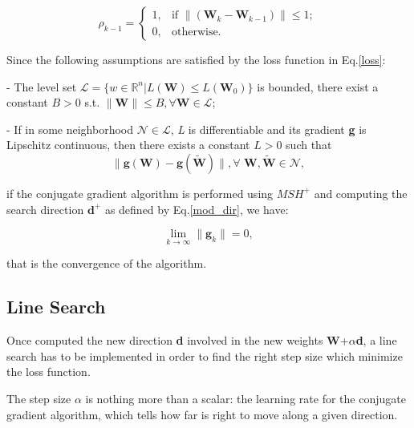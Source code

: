			\begin{equation}
			\label{rho}
			  \rho_{k-1} =\begin{cases}
			    1 , & \text{if }\|(\textbf{W}_k - \textbf{W}_{k-1})\| \leq 1;\\
			    0 , & \text{otherwise.}
			  \end{cases}
			\end{equation}

			Since the following assumptions are satisfied by the loss function in Eq.\ref{loss}:

			\begin{asu} - \label{as:1}
  				The level set $\mathcal{L} = \{w \in \mathbb{R}^n | \textit{L}(\textbf{W}) \leq L(\textbf{W}_0)\}$ is bounded, there exist a constant $B > 0$ s.t. $\|\textbf{W}\| \leq B, \forall \textbf{W} \in \mathcal{L}$;
			\end{asu}

			\begin{asu} - \label{as:2}
				If in some neighborhood $\mathcal{N} \in \mathcal{L}$, \textit{L} is differentiable and its gradient \textbf{g} is Lipschitz continuous, then there exists a constant $ L > 0 $ such that
				\begin{equation}
				\label{ass2}
				  \|\textbf{g}(\textbf{W})-\textbf{g}(\widetilde{\textbf{W}})\|, \forall \textbf{ W},\widetilde{\textbf{W}} \in \mathcal{N},
				\end{equation}
			\end{asu}
			if the conjugate gradient algorithm is performed using $MSH^+$ and computing the search direction $\textbf{d}^+$ as defined by Eq.\ref{mod_dir}, we have:

			\begin{equation}
			\label{conv_mhs}
			  \lim_{k \to \infty} \|\textbf{g}_k\| = 0,
			\end{equation}

			that is the convergence of the algorithm.


		\subsection{Line Search} 
		\label{sub:line_search}
			Once computed the new direction \textbf{d} involved in the new weights \textbf{W}+$\alpha$\textbf{d}, a line search has to be implemented in order to find the right step size which minimize the loss function.

			The step size $\alpha$ is nothing more than a scalar: the learning rate for the conjugate gradient algorithm, which tells how far is right to move along a given direction.

